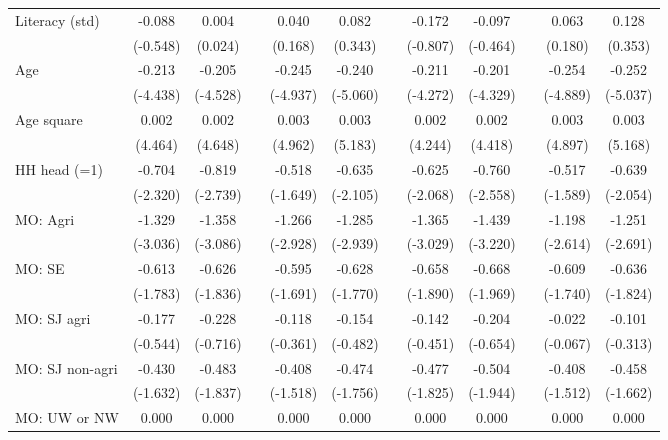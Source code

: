 {\begin{longtable}{@{\extracolsep{\fill}}lccccccccccc}
    Literacy (std) & -0.088 & 0.004 &       & 0.040 & 0.082 &       & -0.172 & -0.097 &       & 0.063 & 0.128 \\
          & (-0.548) & (0.024) &       & (0.168) & (0.343) &       & (-0.807) & (-0.464) &       & (0.180) & (0.353) \\
    Age   & -0.213 & -0.205 &       & -0.245 & -0.240 &       & -0.211 & -0.201 &       & -0.254 & -0.252 \\
          & (-4.438) & (-4.528) &       & (-4.937) & (-5.060) &       & (-4.272) & (-4.329) &       & (-4.889) & (-5.037) \\
    Age square & 0.002 & 0.002 &       & 0.003 & 0.003 &       & 0.002 & 0.002 &       & 0.003 & 0.003 \\
          & (4.464) & (4.648) &       & (4.962) & (5.183) &       & (4.244) & (4.418) &       & (4.897) & (5.168) \\
    HH head (=1) & -0.704 & -0.819 &       & -0.518 & -0.635 &       & -0.625 & -0.760 &       & -0.517 & -0.639 \\
          & (-2.320) & (-2.739) &       & (-1.649) & (-2.105) &       & (-2.068) & (-2.558) &       & (-1.589) & (-2.054) \\
    MO: Agri & -1.329 & -1.358 &       & -1.266 & -1.285 &       & -1.365 & -1.439 &       & -1.198 & -1.251 \\
          & (-3.036) & (-3.086) &       & (-2.928) & (-2.939) &       & (-3.029) & (-3.220) &       & (-2.614) & (-2.691) \\
    MO: SE & -0.613 & -0.626 &       & -0.595 & -0.628 &       & -0.658 & -0.668 &       & -0.609 & -0.636 \\
          & (-1.783) & (-1.836) &       & (-1.691) & (-1.770) &       & (-1.890) & (-1.969) &       & (-1.740) & (-1.824) \\
    MO: SJ agri & -0.177 & -0.228 &       & -0.118 & -0.154 &       & -0.142 & -0.204 &       & -0.022 & -0.101 \\
          & (-0.544) & (-0.716) &       & (-0.361) & (-0.482) &       & (-0.451) & (-0.654) &       & (-0.067) & (-0.313) \\
    MO: SJ non-agri & -0.430 & -0.483 &       & -0.408 & -0.474 &       & -0.477 & -0.504 &       & -0.408 & -0.458 \\
          & (-1.632) & (-1.837) &       & (-1.518) & (-1.756) &       & (-1.825) & (-1.944) &       & (-1.512) & (-1.662) \\
    MO: UW or NW & 0.000 & 0.000 &       & 0.000 & 0.000 &       & 0.000 & 0.000 &       & 0.000 & 0.000 \\

\end{longtable}}

